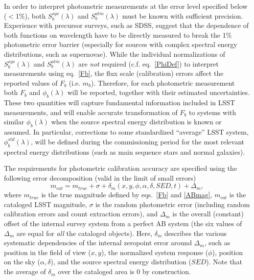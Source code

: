 In order to interpret photometric measurements at the error level
specified below ($<$1\%), both $S_b^{sys}(\lambda)$ and $S_b^{atm}(\lambda)$
must be known with sufficient precision. Experience with precursor surveys,
such as SDSS, suggest that the dependence of both functions on
wavelength have to be directly measured to break the 1\% photometric error
barrier (especially for sources with complex spectral energy distributions,
such as supernovae). While the individual normalizations of $S_b^{sys}(\lambda)$ and
$S_b^{atm}(\lambda)$ are {\it not} required (c.f. eq.~\ref{PhiDef}) to
interpret measurements using eq.~\ref{Fb}, the flux scale (calibration)
errors affect the reported values of $F_b$ (i.e. $m_b$). Therefore,
for each photometric measurement both $F_b$ and $\phi_b(\lambda)$
will be reported, together with their estimated uncertainties. These
two quantities will capture fundamental information included in LSST
measurements, and will enable accurate transformation of $F_b$
to systems with similar $\phi_b(\lambda)$ when the source spectral
energy distribution is known or assumed. In particular, corrections
to some standardized ``average'' LSST system, $\phi_b^{std}(\lambda)$,
will be defined during the commissioning period for the most relevant
spectral energy distributions (such as main sequence stars and normal
galaxies).




The requirements for photometric calibration accuracy are specified using
the following error decomposition (valid in the limit of small errors)
\begin{equation}
\label{photoSysErr}
 m_{cat} = m_{true} + \sigma + \delta_m(x,y,\phi,\alpha,\delta,SED,t) + \Delta_m,
\end{equation}
where $m_{true}$ is the true magnitude defined by eqs.~\ref{Fb} and
\ref{ABmag}, $m_{cat}$ is the cataloged LSST magnitude, $\sigma$ is the random
photometric error (including random calibration errors and count extraction
errors), and $\Delta_m$ is the overall (constant) offset of the
internal survey system from a perfect AB system (the six values of $\Delta_m$
are equal for {\it all} the cataloged objects). Here, $\delta_m$ describes
the various systematic dependencies of the internal zeropoint error around
$\Delta_m$, such as position in the field of view ($x,y$), the normalized
system response ($\phi$), position on the sky ($\alpha, \delta$), and
the source spectral energy distribution ($SED$). Note that the average of
$\delta_m$ over the cataloged area is 0 by construction.

